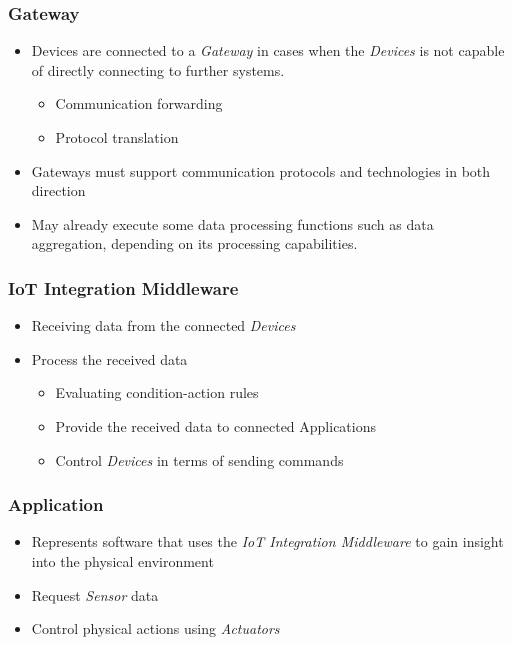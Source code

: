 \documentclass{../iot-lecture}
\begin{document}
\begin{frame}
  \frametitle{Gateway}
  \begin{itemize}
    \item Devices are connected to a \textit{\color{Cyan} Gateway} in cases when the \textit{\color{LimeGreen} Devices} is not capable of directly connecting to further systems.
    \begin{itemize}
      \item Communication forwarding
      \item Protocol translation
    \end{itemize}
    \item Gateways must support communication protocols and technologies in both direction
    \item May already execute some data processing functions such as data aggregation, depending on its processing capabilities.
  \end{itemize}
\end{frame}

\begin{frame}
  \frametitle{IoT Integration Middleware}
  \begin{itemize}
    \item Receiving data from the connected \textit{\color{LimeGreen} Devices}
    \item Process the received data
    \begin{itemize}
      \item Evaluating condition-action rules
      \item Provide the received data to connected Applications
      \item Control \textit{\color{LimeGreen} Devices} in terms of sending commands
    \end{itemize}
  \end{itemize}
\end{frame}

\begin{frame}
  \frametitle{Application}
  \begin{itemize}
    \item Represents software that uses the \textit{\color{TealBlue} IoT Integration Middleware} to gain insight into the physical environment
    \item Request \textit{\color{YellowOrange} Sensor} data
    \item Control physical actions using \textit{\color{RubineRed} Actuators}
  \end{itemize}
\end{frame}
\end{document}
